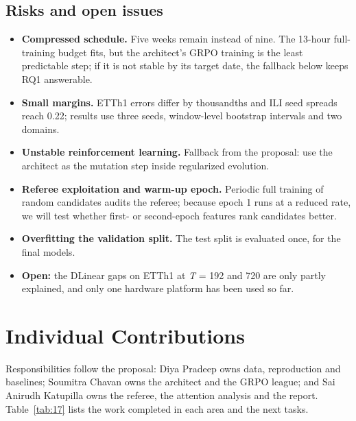 \documentclass[11pt,letterpaper]{article}
\begin{document}
\subsection{Risks and open issues}
\begin{itemize}
\item \textbf{Compressed schedule.} Five weeks remain instead of nine. The 13-hour full-training budget fits, but the architect's GRPO training is the least predictable step; if it is not stable by its target date, the fallback below keeps RQ1 answerable.
\item \textbf{Small margins.} ETTh1 errors differ by thousandths and ILI seed spreads reach 0.22; results use three seeds, window-level bootstrap intervals and two domains.
\item \textbf{Unstable reinforcement learning.} Fallback from the proposal: use the architect as the mutation step inside regularized evolution.
\item \textbf{Referee exploitation and warm-up epoch.} Periodic full training of random candidates audits the referee; because epoch 1 runs at a reduced rate, we will test whether first- or second-epoch features rank candidates better.
\item \textbf{Overfitting the validation split.} The test split is evaluated once, for the final models.
\item \textbf{Open:} the DLinear gaps on ETTh1 at \textit{T} = 192 and 720 are only partly explained, and only one hardware platform has been used so far.
\end{itemize}

\section{Individual Contributions}
Responsibilities follow the proposal: Diya Pradeep owns data, reproduction and baselines; Soumitra Chavan owns the architect and the GRPO league; and Sai Anirudh Katupilla owns the referee, the attention analysis and the report. Table~\ref{tab:17} lists the work completed in each area and the next tasks.
\end{document}

